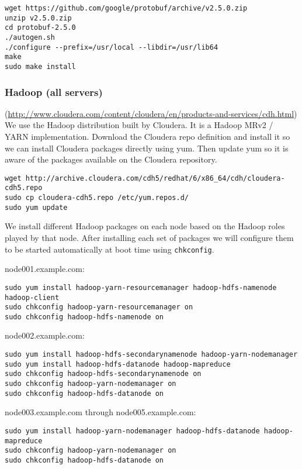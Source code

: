 \begin{verbatim}
wget https://github.com/google/protobuf/archive/v2.5.0.zip
unzip v2.5.0.zip
cd protobuf-2.5.0
./autogen.sh 
./configure --prefix=/usr/local --libdir=/usr/lib64
make
sudo make install
\end{verbatim}

\subsubsection{Hadoop (all servers)} (\url{http://www.cloudera.com/content/cloudera/en/products-and-services/cdh.html})\\
We use the Hadoop distribution built by Cloudera.  It is a Hadoop MRv2 /
YARN implementation.  Download the Cloudera repo definition and install
it so we can install Cloudera packages directly using yum.  Then update
yum so it is aware of the packages available on the Cloudera repository.

\begin{verbatim}
wget http://archive.cloudera.com/cdh5/redhat/6/x86_64/cdh/cloudera-cdh5.repo
sudo cp cloudera-cdh5.repo /etc/yum.repos.d/
sudo yum update
\end{verbatim}

We install different Hadoop packages on each node based on the Hadoop roles
played by that node.  After installing each set of packages we will configure
them to be started automatically at boot time using \verb|chkconfig|.

node001.example.com:
\begin{verbatim}
sudo yum install hadoop-yarn-resourcemanager hadoop-hdfs-namenode hadoop-client
sudo chkconfig hadoop-yarn-resourcemanager on
sudo chkconfig hadoop-hdfs-namenode on
\end{verbatim}

node002.example.com:
\begin{verbatim}
sudo yum install hadoop-hdfs-secondarynamenode hadoop-yarn-nodemanager
sudo yum install hadoop-hdfs-datanode hadoop-mapreduce 
sudo chkconfig hadoop-hdfs-secondarynamenode on
sudo chkconfig hadoop-yarn-nodemanager on
sudo chkconfig hadoop-hdfs-datanode on
\end{verbatim}

node003.example.com through node005.example.com:
\begin{verbatim}
sudo yum install hadoop-yarn-nodemanager hadoop-hdfs-datanode hadoop-mapreduce
sudo chkconfig hadoop-yarn-nodemanager on
sudo chkconfig hadoop-hdfs-datanode on
\end{verbatim}

